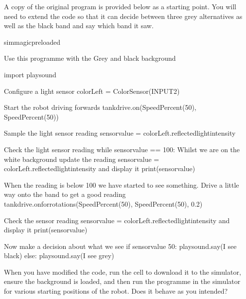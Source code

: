 \documentclass[letterpaper,10pt,english]{sphinxmanual}
\begin{document}
{A copy of the original program is provided below as a starting point. You will need to extend the code so that it can decide between three grey alternatives as well as the black band and say which band it saw.

{
\begin{sphinxVerbatim}[commandchars=\\\{\}]
\llap{\color{nbsphinxin}[ ]:\,\hspace{\fboxrule}\hspace{\fboxsep}}\PYGZpc{}\PYGZpc{}sim\PYGZus{}magic\PYGZus{}preloaded

\PYGZsh{} Use this programme with the \PYGZdq{}Grey and black\PYGZdq{} background

import playsound

\PYGZsh{} Configure a light sensor
colorLeft = ColorSensor(INPUT\PYGZus{}2)

\PYGZsh{} Start the robot driving forwards
tank\PYGZus{}drive.on(SpeedPercent(50), SpeedPercent(50))

\PYGZsh{}Sample the light sensor reading
sensor\PYGZus{}value = colorLeft.reflected\PYGZus{}light\PYGZus{}intensity

\PYGZsh{}Check the light sensor reading
while sensor\PYGZus{}value == 100:
    \PYGZsh{} Whilst we are on the white background
    \PYGZsh{} update the reading
    sensor\PYGZus{}value = colorLeft.reflected\PYGZus{}light\PYGZus{}intensity
    \PYGZsh{} and display it
    print(sensor\PYGZus{}value)

\PYGZsh{} When the reading is below 100
\PYGZsh{} we have started to see something.
\PYGZsh{} Drive a little way onto the band to get a good reading
tank\PYGZus{}drive.on\PYGZus{}for\PYGZus{}rotations(SpeedPercent(50), SpeedPercent(50), 0.2)

\PYGZsh{}Check the sensor reading
sensor\PYGZus{}value = colorLeft.reflected\PYGZus{}light\PYGZus{}intensity
\PYGZsh{} and display it
print(sensor\PYGZus{}value)

\PYGZsh{} Now make a decision about what we see
if sensor\PYGZus{}value \PYGZlt{} 50:
    playsound.say(\PYGZdq{}I see black\PYGZdq{})
else:
    playsound.say(\PYGZdq{}I see grey\PYGZdq{})
\end{sphinxVerbatim}
}

When you have modified the code, run the cell to download it to the simulator, ensure the  background is loaded, and then run the programme in the simulator for various starting positions of the robot. Does it behave as you intended?


}
\end{document}
